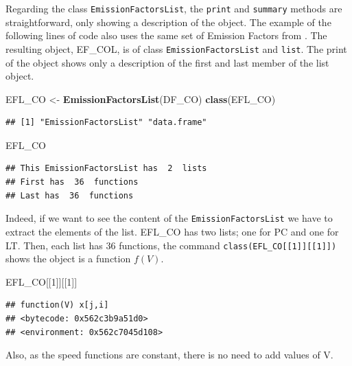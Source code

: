 \documentclass[12pt,graybox,envcountchap,sectrefs]{krantz}
\makeatletter
\newenvironment{Shaded}{\begin{snugshade}}{\end{snugshade}}
\newcommand{\KeywordTok}[1]{\textcolor[rgb]{0.13,0.29,0.53}{\textbf{#1}}}
\newcommand{\DecValTok}[1]{\textcolor[rgb]{0.00,0.00,0.81}{#1}}
\newcommand{\StringTok}[1]{\textcolor[rgb]{0.31,0.60,0.02}{#1}}
\newcommand{\NormalTok}[1]{#1}
\newenvironment{kframe}{%
\medskip{}
\setlength{\fboxsep}{.8em}
 \def\at@end@of@kframe{}%
 \ifinner\ifhmode%
  \def\at@end@of@kframe{\end{minipage}}%
  \begin{minipage}{\columnwidth}%
 \fi\fi%
 \def\FrameCommand##1{\hskip\@totalleftmargin \hskip-\fboxsep
 \colorbox{shadecolor}{##1}\hskip-\fboxsep
     \hskip-\linewidth \hskip-\@totalleftmargin \hskip\columnwidth}%
 \MakeFramed {\advance\hsize-\width
   \@totalleftmargin\z@ \linewidth\hsize
   \@setminipage}}%
 {\par\unskip\endMakeFramed%
 \at@end@of@kframe}
\renewenvironment{Shaded}{\begin{kframe}}{\end{kframe}}
\theoremstyle{definition}
\theoremstyle{definition}
\theoremstyle{definition}
\theoremstyle{remark}
\makeatother
\begin{document}
Regarding the class \texttt{EmissionFactorsList}, the \texttt{print} and
\texttt{summary} methods are straightforward, only showing a description
of the object. The example of the following lines of code also uses the
same set of Emission Factors from \citet{CETESB2015}. The resulting
object, EF\_COL, is of class \texttt{EmissionFactorsList} and
\texttt{list}. The print of the object shows only a description of the
first and last member of the list object.

\begin{Shaded}
\begin{Highlighting}[]
\NormalTok{EFL_CO <-}\StringTok{ }\KeywordTok{EmissionFactorsList}\NormalTok{(DF_CO)}
\KeywordTok{class}\NormalTok{(EFL_CO)}
\end{Highlighting}
\end{Shaded}

\begin{verbatim}
## [1] "EmissionFactorsList" "data.frame"
\end{verbatim}

\begin{Shaded}
\begin{Highlighting}[]
\NormalTok{EFL_CO}
\end{Highlighting}
\end{Shaded}

\begin{verbatim}
## This EmissionFactorsList has  2  lists
## First has  36  functions
## Last has  36  functions
\end{verbatim}

Indeed, if we want to see the content of the
\texttt{EmissionFactorsList} we have to extract the elements of the
list. EFL\_CO has two lists; one for PC and one for LT. Then, each list
has 36 functions, the command
\texttt{class(EFL\_CO{[}{[}1{]}{]}{[}{[}1{]}{]})} shows the object is a
function \(f(V)\).

\begin{Shaded}
\begin{Highlighting}[]
\NormalTok{EFL_CO[[}\DecValTok{1}\NormalTok{]][[}\DecValTok{1}\NormalTok{]]}
\end{Highlighting}
\end{Shaded}

\begin{verbatim}
## function(V) x[j,i]
## <bytecode: 0x562c3b9a51d0>
## <environment: 0x562c7045d108>
\end{verbatim}

Also, as the speed functions are constant, there is no need to add
values of V.
\end{document}
